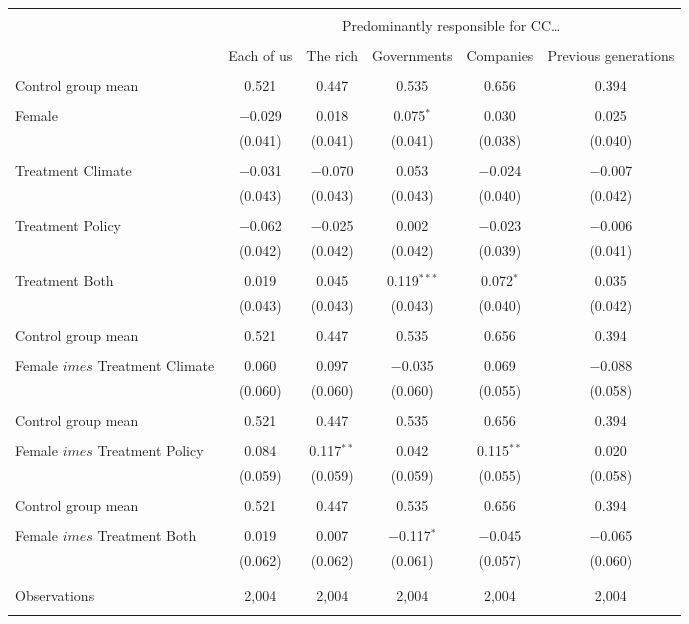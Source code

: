 
\begin{tabular}{@{\extracolsep{5pt}}lccccc} 
\\[-1.8ex]\hline 
\hline \\[-1.8ex] 
 & \multicolumn{5}{c}{Predominantly responsible for CC…} \\ 
\cline{2-6} 
\\[-1.8ex] & Each of us & The rich & Governments & Companies & Previous generations \\ 
\hline \\[-1.8ex] 
 Control group mean & 0.521 & 0.447 & 0.535 & 0.656 & 0.394  \\ \hline \\[-1.8ex] Female & $-$0.029 & 0.018 & 0.075$^{*}$ & 0.030 & 0.025 \\ 
  & (0.041) & (0.041) & (0.041) & (0.038) & (0.040) \\ 
  & & & & & \\ 
 Treatment Climate & $-$0.031 & $-$0.070 & 0.053 & $-$0.024 & $-$0.007 \\ 
  & (0.043) & (0.043) & (0.043) & (0.040) & (0.042) \\ 
  & & & & & \\ 
 Treatment Policy & $-$0.062 & $-$0.025 & 0.002 & $-$0.023 & $-$0.006 \\ 
  & (0.042) & (0.042) & (0.042) & (0.039) & (0.041) \\ 
  & & & & & \\ 
 Treatment Both & 0.019 & 0.045 & 0.119$^{***}$ & 0.072$^{*}$ & 0.035 \\ 
  & (0.043) & (0.043) & (0.043) & (0.040) & (0.042) \\ 
  & & & & & \\ 
 Control group mean & 0.521 & 0.447 & 0.535 & 0.656 & 0.394  \\ \hline \\[-1.8ex] Female $	imes$ Treatment Climate & 0.060 & 0.097 & $-$0.035 & 0.069 & $-$0.088 \\ 
  & (0.060) & (0.060) & (0.060) & (0.055) & (0.058) \\ 
  & & & & & \\ 
 Control group mean & 0.521 & 0.447 & 0.535 & 0.656 & 0.394  \\ \hline \\[-1.8ex] Female $	imes$ Treatment Policy & 0.084 & 0.117$^{**}$ & 0.042 & 0.115$^{**}$ & 0.020 \\ 
  & (0.059) & (0.059) & (0.059) & (0.055) & (0.058) \\ 
  & & & & & \\ 
 Control group mean & 0.521 & 0.447 & 0.535 & 0.656 & 0.394  \\ \hline \\[-1.8ex] Female $	imes$ Treatment Both & 0.019 & 0.007 & $-$0.117$^{*}$ & $-$0.045 & $-$0.065 \\ 
  & (0.062) & (0.062) & (0.061) & (0.057) & (0.060) \\ 
  & & & & & \\ 
\hline \\[-1.8ex] 

Observations & 2,004 & 2,004 & 2,004 & 2,004 & 2,004 \\ 
\hline 
\hline \\[-1.8ex] 
\end{tabular} 